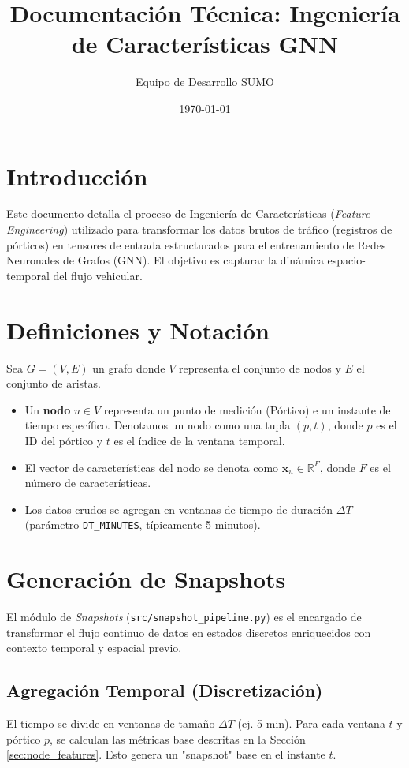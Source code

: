 \documentclass{article}
\title{Documentación Técnica: Ingeniería de Características GNN}
\author{Equipo de Desarrollo SUMO}
\date{\today}
\begin{document}
\maketitle

\section{Introducción}
Este documento detalla el proceso de Ingeniería de Características (\textit{Feature Engineering}) utilizado para transformar los datos brutos de tráfico (registros de pórticos) en tensores de entrada estructurados para el entrenamiento de Redes Neuronales de Grafos (GNN). El objetivo es capturar la dinámica espacio-temporal del flujo vehicular.

\section{Definiciones y Notación}
Sea $G = (V, E)$ un grafo donde $V$ representa el conjunto de nodos y $E$ el conjunto de aristas.
\begin{itemize}
    \item Un \textbf{nodo} $u \in V$ representa un punto de medición (Pórtico) e un instante de tiempo específico. Denotamos un nodo como una tupla $(p, t)$, donde $p$ es el ID del pórtico y $t$ es el índice de la ventana temporal.
    \item El vector de características del nodo se denota como $\mathbf{x}_u \in \mathbb{R}^F$, donde $F$ es el número de características.
    \item Los datos crudos se agregan en ventanas de tiempo de duración $\Delta T$ (parámetro \texttt{DT\_MINUTES}, típicamente 5 minutos).
\end{itemize}

\section{Generación de Snapshots}
El módulo de \textit{Snapshots} (\texttt{src/snapshot\_pipeline.py}) es el encargado de transformar el flujo continuo de datos en estados discretos enriquecidos con contexto temporal y espacial previo.

\subsection{Agregación Temporal (Discretización)}
El tiempo se divide en ventanas de tamaño $\Delta T$ (ej. 5 min). Para cada ventana $t$ y pórtico $p$, se calculan las métricas base descritas en la Sección \ref{sec:node_features}. Esto genera un "snapshot" base en el instante $t$.
\end{document}
